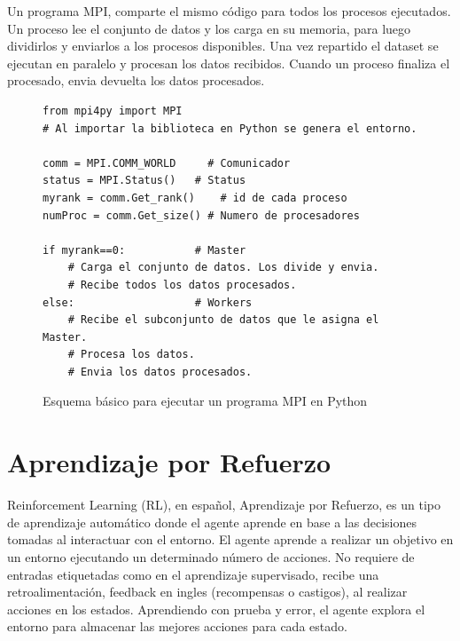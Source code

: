 	\vspace{-0.2cm}
	
	Un programa MPI, comparte el mismo código para todos los procesos ejecutados. Un proceso lee el conjunto de datos y los carga en su memoria, para luego dividirlos y enviarlos a los procesos disponibles. Una vez repartido el dataset se ejecutan en paralelo y procesan los datos recibidos. Cuando un proceso finaliza el procesado, envia devuelta los datos procesados.
	
	\vspace{-0.1cm}

	\begin{figure}[!h]
		
		\begin{lstlisting}[frame=single]
from mpi4py import MPI 
# Al importar la biblioteca en Python se genera el entorno.

comm = MPI.COMM_WORLD     # Comunicador
status = MPI.Status()   # Status
myrank = comm.Get_rank() 	# id de cada proceso
numProc = comm.Get_size() # Numero de procesadores

if myrank==0:           # Master
    # Carga el conjunto de datos. Los divide y envia.
    # Recibe todos los datos procesados.
else:                   # Workers
    # Recibe el subconjunto de datos que le asigna el Master.
    # Procesa los datos.
    # Envia los datos procesados.
		\end{lstlisting}
		\caption{Esquema básico para ejecutar un programa MPI en Python}
		\label{fig:esquea_mpi}
	\end{figure}
	
	\newpage

\section{Aprendizaje por Refuerzo}

	Reinforcement Learning (RL), en español, Aprendizaje por Refuerzo, es un tipo de aprendizaje automático donde el agente aprende en base a las decisiones tomadas al interactuar con el entorno. El agente aprende a realizar un objetivo en un entorno ejecutando un determinado número de acciones. No requiere de entradas etiquetadas como en el aprendizaje supervisado, recibe una retroalimentación, feedback en ingles (recompensas o castigos), al realizar acciones en los estados. Aprendiendo con prueba y error, el agente explora el entorno para almacenar las mejores acciones para cada estado. 

